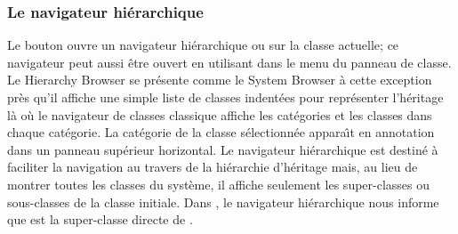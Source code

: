 \documentclass[a4paper,10pt,twoside]{book}
\begin{document}
\subsubsection{Le navigateur hi\'erarchique}
\label{sec:hierarchy}

Le bouton  ouvre un navigateur hi\'erarchique ou
 sur la classe actuelle; ce navigateur peut aussi \^etre ouvert en utilisant  dans le menu du
panneau de classe.
Le Hierarchy Browser se pr\'esente comme le System Browser \`a cette exception
pr\`es qu'il affiche une simple liste de classes indent\'ees pour repr\'esenter
l'h\'eritage l\`a o\`u le navigateur de classes classique affiche les cat\'egories et les classes dans chaque cat\'egorie.
La cat\'egorie de la classe s\'electionn\'ee appara\^{\i}t en annotation
dans un panneau sup\'erieur horizontal.
Le navigateur hi\'erarchique est destin\'e \`a faciliter la navigation au travers de la hi\'erarchie d'h\'eritage mais, au lieu de montrer toutes
les classes du syst\`eme, il affiche seulement les super-classes ou
sous-classes de la classe initiale. 
Dans , le navigateur hi\'erarchique nous
informe que  est la super-classe directe de 
.
\end{document}
